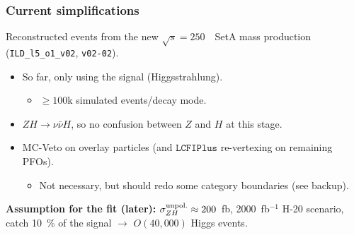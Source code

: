 
\begin{frame}
  \frametitle{Current simplifications}
  
  Reconstructed events from the new $\sqrt{s} = 250$~\GeV~SetA mass production (\texttt{ILD\_l5\_o1\_v02}, \texttt{v02-02}).
  \begin{itemize}
    \item So far, only using the signal (Higgsstrahlung).
    \begin{itemize}
      \item $\geq 100$k simulated events/decay mode.
     \end{itemize}
    \item $ZH \rightarrow \nu \bar{\nu}H$, so no confusion between $Z$ and $H$ at this stage.
    \item MC-Veto on overlay particles (and $\texttt{LCFIPlus}$ re-vertexing on remaining PFOs).
    \begin{itemize}
      \item Not necessary, but should redo some category boundaries (see backup).
     \end{itemize}
  \end{itemize}
  \textbf{Assumption for the fit (later):}
  $\sigma_{ZH}^{\textnormal{unpol.}} \approx 200$~fb, 2000~fb$^{-1}$ H-20 scenario, \\
  catch 10~\% of the signal $\rightarrow$ $O(40,000)$ Higgs events.

  \end{frame}
